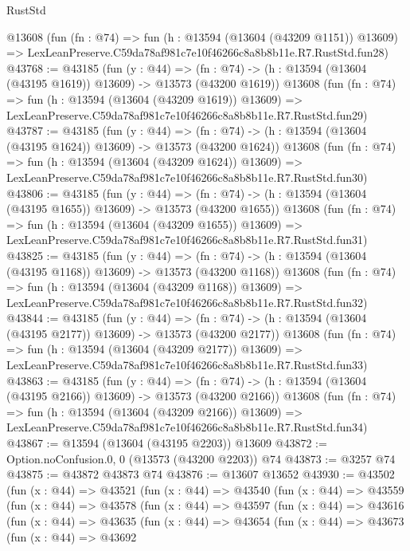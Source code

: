\begin{lexlean}{RustStd}
\begin{coremodule}
    @13608
    (fun (fn : @74) =>
    fun (h : @13594 (@13604 (@43209 @1151)) @13609) =>
    LexLeanPreserve.C59da78af981c7e10f46266c8a8b8b11e.R7.RustStd.fun28)
@43768 := @43185
    (fun (y : @44) =>
    (fn : @74) -> (h : @13594 (@13604 (@43195 @1619)) @13609) -> @13573 (@43200 @1619))
    @13608
    (fun (fn : @74) =>
    fun (h : @13594 (@13604 (@43209 @1619)) @13609) =>
    LexLeanPreserve.C59da78af981c7e10f46266c8a8b8b11e.R7.RustStd.fun29)
@43787 := @43185
    (fun (y : @44) =>
    (fn : @74) -> (h : @13594 (@13604 (@43195 @1624)) @13609) -> @13573 (@43200 @1624))
    @13608
    (fun (fn : @74) =>
    fun (h : @13594 (@13604 (@43209 @1624)) @13609) =>
    LexLeanPreserve.C59da78af981c7e10f46266c8a8b8b11e.R7.RustStd.fun30)
@43806 := @43185
    (fun (y : @44) =>
    (fn : @74) -> (h : @13594 (@13604 (@43195 @1655)) @13609) -> @13573 (@43200 @1655))
    @13608
    (fun (fn : @74) =>
    fun (h : @13594 (@13604 (@43209 @1655)) @13609) =>
    LexLeanPreserve.C59da78af981c7e10f46266c8a8b8b11e.R7.RustStd.fun31)
@43825 := @43185
    (fun (y : @44) =>
    (fn : @74) -> (h : @13594 (@13604 (@43195 @1168)) @13609) -> @13573 (@43200 @1168))
    @13608
    (fun (fn : @74) =>
    fun (h : @13594 (@13604 (@43209 @1168)) @13609) =>
    LexLeanPreserve.C59da78af981c7e10f46266c8a8b8b11e.R7.RustStd.fun32)
@43844 := @43185
    (fun (y : @44) =>
    (fn : @74) -> (h : @13594 (@13604 (@43195 @2177)) @13609) -> @13573 (@43200 @2177))
    @13608
    (fun (fn : @74) =>
    fun (h : @13594 (@13604 (@43209 @2177)) @13609) =>
    LexLeanPreserve.C59da78af981c7e10f46266c8a8b8b11e.R7.RustStd.fun33)
@43863 := @43185
    (fun (y : @44) =>
    (fn : @74) -> (h : @13594 (@13604 (@43195 @2166)) @13609) -> @13573 (@43200 @2166))
    @13608
    (fun (fn : @74) =>
    fun (h : @13594 (@13604 (@43209 @2166)) @13609) =>
    LexLeanPreserve.C59da78af981c7e10f46266c8a8b8b11e.R7.RustStd.fun34)
@43867 := @13594 (@13604 (@43195 @2203)) @13609
@43872 := Option.noConfusion.{0, 0} (@13573 (@43200 @2203)) @74
@43873 := @3257 @74
@43875 := @43872 @43873 @74
@43876 := @13607 @13652
@43930 := @43502
    (fun (x : @44) =>
    @43521
      (fun (x : @44) =>
      @43540
        (fun (x : @44) =>
        @43559
          (fun (x : @44) =>
          @43578
            (fun (x : @44) =>
            @43597
              (fun (x : @44) =>
              @43616
                (fun (x : @44) =>
                @43635
                  (fun (x : @44) =>
                  @43654
                    (fun (x : @44) =>
                    @43673
                      (fun (x : @44) =>
                      @43692

\end{coremodule}
\end{lexlean}
